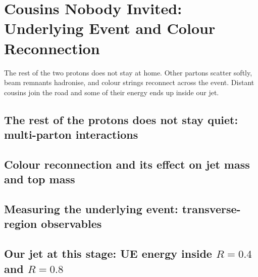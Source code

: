 \chapter{Cousins Nobody Invited: Underlying Event and Colour Reconnection}
\label{ch:uninvited_cousins}

\begin{journeybox}
The rest of the two protons does not stay at home. Other partons scatter softly,
beam remnants hadronise, and colour strings reconnect across the event. Distant
cousins join the road and some of their energy ends up inside our jet.
\end{journeybox}


\section{The rest of the protons does not stay quiet: multi-parton interactions}
\label{sec:uninvited_cousins:the_rest_of_the_protons_does_not_stay_qu}

\section{Colour reconnection and its effect on jet mass and top mass}
\label{sec:uninvited_cousins:colour_reconnection_and_its_effect_on_je}

\section{Measuring the underlying event: transverse-region observables}
\label{sec:uninvited_cousins:measuring_the_underlying_event_transvers}

\section{Our jet at this stage: UE energy inside $R=0.4$ and $R=0.8$}
\label{sec:uninvited_cousins:our_jet_at_this_stage_ue_energy_inside_r}

